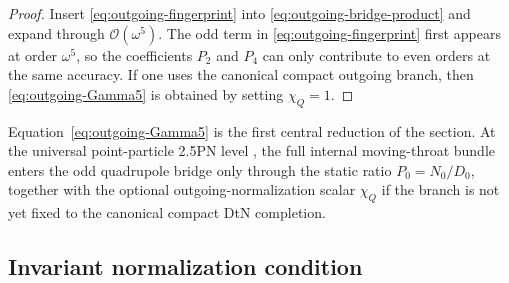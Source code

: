 \documentclass[11pt]{article}
\theoremstyle{definition}
\newcommand{\cO}{\mathcal O}
\begin{document}
\begin{proof}
Insert \eqref{eq:outgoing-fingerprint} into \eqref{eq:outgoing-bridge-product} and expand through $\cO(\omega^5)$. The odd term in \eqref{eq:outgoing-fingerprint} first appears at order $\omega^5$, so the coefficients $P_2$ and $P_4$ can only contribute to even orders at the same accuracy. If one uses the canonical compact outgoing branch, then \eqref{eq:outgoing-Gamma5} is obtained by setting $\chi_Q=1$.
\end{proof}

Equation~\eqref{eq:outgoing-Gamma5} is the first central reduction of the section. At the universal point-particle 2.5PN level \cite{Norris2026TwoPointFivePN}, the full internal moving-throat bundle enters the odd quadrupole bridge only through the static ratio $P_0=N_0/D_0$, together with the optional outgoing-normalization scalar $\chi_Q$ if the branch is not yet fixed to the canonical compact DtN completion.

\subsection{Invariant normalization condition}
\end{document}
